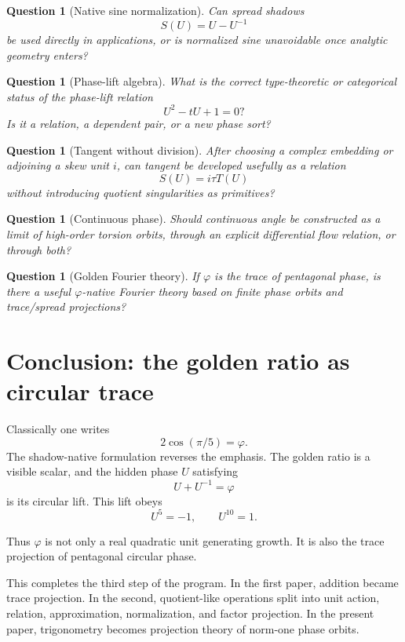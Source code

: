 \documentclass[11pt]{article}
\newtheorem{question}[definition]{Question}
\newcommand{\ph}{\varphi}
\begin{document}
\begin{question}[Native sine normalization]
Can spread shadows
\[
    S(U)=U-U^{-1}
\]
be used directly in applications, or is normalized sine unavoidable once analytic geometry enters?
\end{question}

\begin{question}[Phase-lift algebra]
What is the correct type-theoretic or categorical status of the phase-lift relation
\[
    U^2-tU+1=0?
\]
Is it a relation, a dependent pair, or a new phase sort?
\end{question}

\begin{question}[Tangent without division]
After choosing a complex embedding or adjoining a skew unit $i$, can tangent be developed usefully as a relation
\[
    S(U)=i\tau T(U)
\]
without introducing quotient singularities as primitives?
\end{question}

\begin{question}[Continuous phase]
Should continuous angle be constructed as a limit of high-order torsion orbits, through an explicit differential flow relation, or through both?
\end{question}

\begin{question}[Golden Fourier theory]
If $\ph$ is the trace of pentagonal phase, is there a useful $\ph$-native Fourier theory based on finite phase orbits and trace/spread projections?
\end{question}

\section{Conclusion: the golden ratio as circular trace}

Classically one writes
\[
    2\cos(\pi/5)=\ph.
\]
The shadow-native formulation reverses the emphasis.  The golden ratio is a visible scalar, and the hidden phase $U$ satisfying
\[
    U+U^{-1}=\ph
\]
is its circular lift.  This lift obeys
\[
    U^5=-1,
    \qquad
    U^{10}=1.
\]

Thus $\ph$ is not only a real quadratic unit generating growth.  It is also the trace projection of pentagonal circular phase.

This completes the third step of the program.  In the first paper, addition became trace projection.  In the second, quotient-like operations split into unit action, relation, approximation, normalization, and factor projection.  In the present paper, trigonometry becomes projection theory of norm-one phase orbits.
\end{document}
